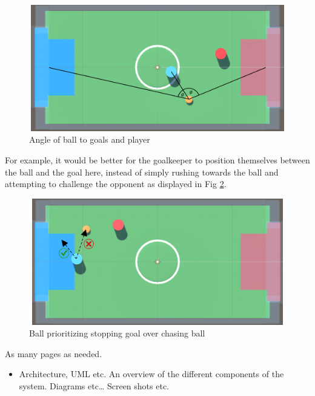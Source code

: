 \begin{figure}[H]
    \centering
    \includegraphics[width=115mm, height=55mm]{img/Image5.png}
    \caption{Angle of ball to goals and player}
    \label{fig:sd4}
\end{figure}

\begin{flushleft}
For example, it would be better for the goalkeeper to position themselves between the ball and the goal here, instead of simply rushing towards the ball and attempting to challenge the opponent as displayed in Fig \ref{fig:sd5}.
\end{flushleft}

\begin{figure}[H]
    \centering
    \includegraphics[width=115mm, height=55mm]{img/Image4.png}
    \caption{Ball prioritizing stopping goal over chasing ball}
    \label{fig:sd5}
\end{figure}

As many pages as needed.
\begin{itemize}
\item Architecture, UML etc. An overview of the different components of the system. Diagrams etc… Screen shots etc.
\end{itemize}

